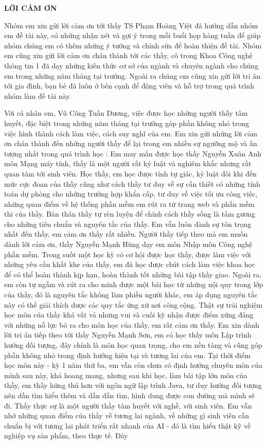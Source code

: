 \documentclass[../BTL.tex]{subfiles}
\begin{document}
\begin{center}
    \Large{\textbf{LỜI CẢM ƠN}}\\
\end{center}
\vspace{1cm}
Nhóm em xin gửi lời cảm ơn tới thầy TS Phạm Hoàng Việt đã hướng dẫn nhóm em đề tài này, có những nhận xét và gợi ý trong mỗi buổi họp hàng tuần để giúp nhóm chúng em có thêm những ý tưởng và chỉnh sửa để hoàn thiện đề tài.
Nhóm em cũng xin gửi lời cảm ơn chân thành tới các thầy, cô trong Khoa Công nghệ thông tin 1 đã dạy những kiến thức cơ sở của ngành và chuyên ngành cho chúng em trong những năm tháng tại trường.
Ngoài ra chúng em cũng xin gửi lời tri ân tới gia đình, bạn bè đã luôn ở bên cạnh để động viên và hỗ trợ trong quá trình nhóm làm đề tài này. 


Với cá nhân em, Vũ Công Tuấn Dương, việc được học những người thầy tâm huyết, đặc biệt trong những năm tháng tại trường góp phần không nhỏ trong việc hình thành cách làm việc, cách suy nghĩ của em. Em xin gửi những lời cảm ơn chân thành đến những người thầy để lại trong em nhiều sự ngưỡng mộ và ấn tượng nhất trong quá trình học : Em may mắn được học thầy Nguyễn Xuân Anh môn Mạng máy tính, thầy là một người rất kỷ luật và nghiêm khắc nhưng rất quan tâm tới sinh viên. Học thầy, em học được tính tự giác, kỷ luật đôi khi đến mức cực đoan của thầy cũng như cách thầy tư duy về sự cần thiết có những tính toán dự phòng cho những trường hợp khẩn cấp, tư duy về việc tối ưu công việc, những quan điểm về hệ thống phần mềm em rút ra từ trang web và phần mềm thi của thầy. Bản thân thầy tự rèn luyện để chính cách thầy sống là tấm gương cho những tiêu chuẩn và nguyên tắc của thầy. Em vẫn luôn dành sự tôn trọng nhất đến thầy, em cảm ơn thầy rất nhiều. Người thầy tiếp theo mà em muốn dành lời cảm ơn, thầy Nguyễn Mạnh Hùng dạy em môn Nhập môn Công nghệ phần mềm. Trong suốt một học kỳ có cơ hội được học thầy, được làm việc với những yêu cầu khắt khe của thầy, em đã học được chút cách làm việc khoa học để có thể hoàn thành kịp hạn, hoàn thành tốt những bài tập thầy giao. Ngoài ra, em còn tự ngẫm và rút ra cho mình được một bài học từ những nội quy trong lớp của thầy, đó là nguyên tắc không làm phiền người khác, em áp dụng nguyên tắc này có thể giải thích dược các quy tắc ứng xử nơi công cộng. Thật sự trải nghiệm học môn của thầy khá vất vả nhưng vui và cuối kỳ nhận được điểm xứng đáng với những nỗ lực bỏ ra cho môn học của thầy, em rất cảm ơn thầy. Em xin dành lời tri ân tiếp theo tới thầy Nguyễn Mạnh Sơn, em có học thầy môn Lập trình hướng đối tượng, đây chính là môn học quan trọng, cho em nền tảng và cũng góp phần không nhỏ trong định hướng hiện tại và tương lai của em. Tại thời điểm học môn này - kỳ 1 năm thứ ba, em vẫn còn chưa có định hướng chuyên môn của mình sau này, khá hoang mang, nhưng sau khi học, làm bài tập lớn môn của thầy, em thấy hứng thú hơn với ngôn ngữ lập trình Java, tư duy hướng đối tượng nên dần tìm hiểu thêm và dần dần tìm, hình dung được con đường mà mình sẽ đi. Thầy thực sự là một người thầy tâm huyết với nghề, với sinh viên. Em vẫn nhớ những quan điểm của thầy về tương lai ngành, về những gì sinh viên cần chuẩn bị với tương lai phát triển rất nhanh của AI - đó là tìm hiểu thật kỹ về nghiệp vụ sản phẩm, theo thực tế. Đây 
\end{document}
